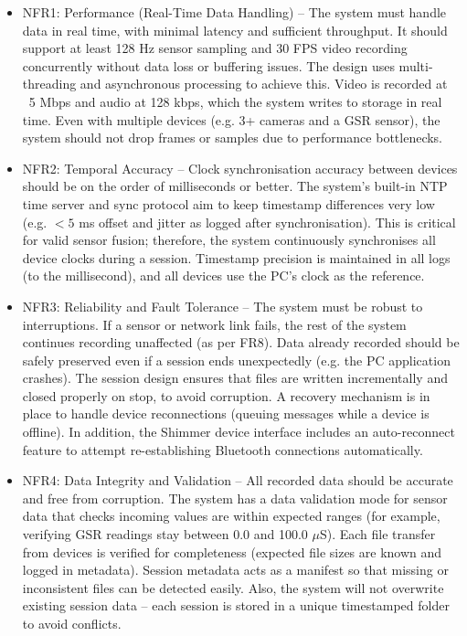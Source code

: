 \begin{itemize}
    \item NFR1: Performance (Real-Time Data Handling) -- The system must handle data in real time, with minimal latency and sufficient throughput. It should support at least 128 Hz sensor sampling and 30 FPS video recording concurrently without data loss or buffering issues. The design uses multi-threading and asynchronous processing to achieve this. Video is recorded at ~5 Mbps and audio at 128 kbps, which the system writes to storage in real time. Even with multiple devices (e.g. 3+ cameras and a GSR sensor), the system should not drop frames or samples due to performance bottlenecks.

    \item NFR2: Temporal Accuracy -- Clock synchronisation accuracy between devices should be on the order of milliseconds or better. The system's built-in NTP time server and sync protocol aim to keep timestamp differences very low (e.g. $<5$ ms offset and jitter as logged after synchronisation). This is critical for valid sensor fusion; therefore, the system continuously synchronises all device clocks during a session. Timestamp precision is maintained in all logs (to the millisecond), and all devices use the PC's clock as the reference.

    \item NFR3: Reliability and Fault Tolerance -- The system must be robust to interruptions. If a sensor or network link fails, the rest of the system continues recording unaffected (as per FR8). Data already recorded should be safely preserved even if a session ends unexpectedly (e.g. the PC application crashes). The session design ensures that files are written incrementally and closed properly on stop, to avoid corruption. A recovery mechanism is in place to handle device reconnections (queuing messages while a device is offline). In addition, the Shimmer device interface includes an auto-reconnect feature to attempt re-establishing Bluetooth connections automatically.

    \item NFR4: Data Integrity and Validation -- All recorded data should be accurate and free from corruption. The system has a data validation mode for sensor data that checks incoming values are within expected ranges (for example, verifying GSR readings stay between 0.0 and 100.0 $\mu$S). Each file transfer from devices is verified for completeness (expected file sizes are known and logged in metadata). Session metadata acts as a manifest so that missing or inconsistent files can be detected easily. Also, the system will not overwrite existing session data -- each session is stored in a unique timestamped folder to avoid conflicts.


\end{itemize}
